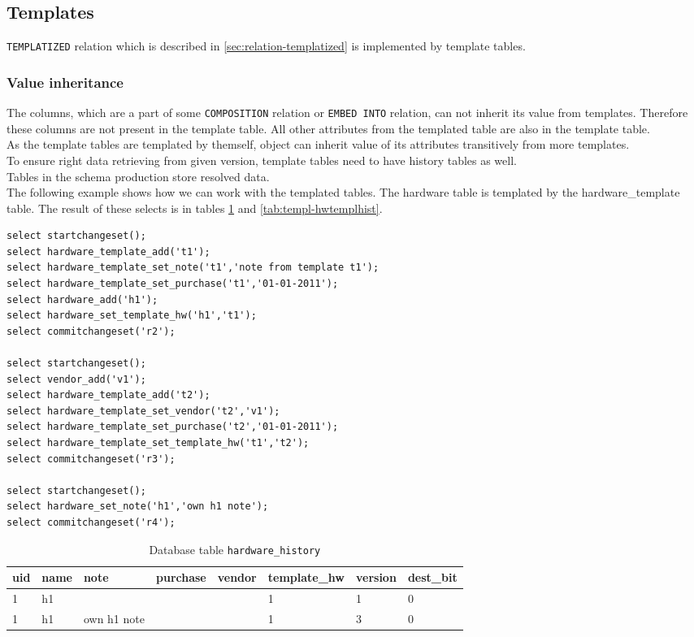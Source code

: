 \documentclass[deska]{subfiles}
\begin{document}
\subsection{Templates}
{\tt TEMPLATIZED} relation which is described in \ref{sec:relation-templatized} is implemented by template tables. 

\subsubsection{Value inheritance}
The columns, which are a part of some {\tt COMPOSITION} relation or {\tt EMBED INTO} relation, can not inherit its value from templates. Therefore these columns are not present in the template table. All other attributes from the templated table are also in the template table.\\
As the template tables are templated by themself, object can inherit value of its attributes transitively from more templates.\\
To ensure right data retrieving from given version, template tables need to have history tables as well.\\
Tables in the schema production store resolved data.\\
The following example shows how we can work with the templated tables. The hardware table is templated by the hardware\_template table. The result of these selects is in tables \ref{tab:templ-hwhist} and \ref{tab:templ-hwtemplhist}.

\begin{verbatim}
select startchangeset();
select hardware_template_add('t1');
select hardware_template_set_note('t1','note from template t1');
select hardware_template_set_purchase('t1','01-01-2011');
select hardware_add('h1');
select hardware_set_template_hw('h1','t1');
select commitchangeset('r2');

select startchangeset();
select vendor_add('v1');
select hardware_template_add('t2');
select hardware_template_set_vendor('t2','v1');
select hardware_template_set_purchase('t2','01-01-2011');
select hardware_template_set_template_hw('t1','t2');
select commitchangeset('r3');

select startchangeset();
select hardware_set_note('h1','own h1 note');
select commitchangeset('r4');
\end{verbatim}


\begin{longtable}{ l | l | l | l | l | l | l | l }
    \caption{Database table {\tt hardware\_history}}
    \label{tab:templ-hwhist} \\
    uid & name & note & purchase & vendor & template\_hw & version & dest\_bit\\
    \hline
    \endhead
    1 & h1 &  &  &  & 1 & 1 & 0\\
    1 & h1 & own h1 note &  &  & 1 & 3 & 0\\
    \hline
\end{longtable}
\end{document}
